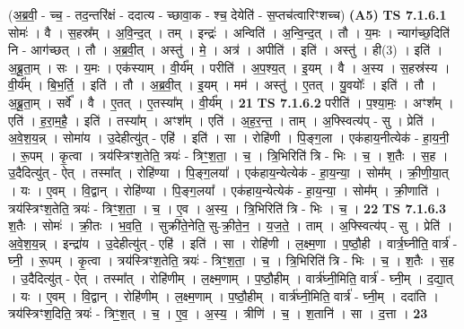 \documentclass[17pt]{extarticle}
\begin{document}
                  \newline
                      (अ॒ब्र॒वी॒ - च्च॒ - तद॒न्तरि॑क्षं - ददात्य - च्छावा॒क - श्च॒ देयेति॑ - स॒प्तच॑त्वारिꣳशच्च)  \textbf{(A5)} \newline \newline
                                \textbf{ TS 7.1.6.1} \newline
                  सोमः॑ । वै । स॒हस्र᳚म् । अ॒वि॒न्द॒त् । तम् । इन्द्रः॑ । अन्विति॑ । अ॒न्वि॒न्द॒त् । तौ । य॒मः । न्याग॑च्छ॒दिति॑ नि - आग॑च्छत् । तौ । अ॒ब्र॒वी॒त् । अस्तु॑ । मे॒ । अत्र॑ । अपीति॑ । इति॑ । अस्तु॑ । ही(3) । इति॑ । अ॒ब्रू॒ता॒म् । सः । य॒मः । एक॑स्याम् । वी॒र्य᳚म् । परीति॑ । अ॒प॒श्य॒त् । इ॒यम् । वै । अ॒स्य । स॒हस्र॑स्य । वी॒र्य᳚म् । बि॒भ॒र्ति॒ । इति॑ । तौ । अ॒ब्र॒वी॒त् । इ॒यम् । मम॑ । अस्तु॑ । ए॒तत् । यु॒वयोः᳚ । इति॑ । तौ । अ॒ब्रू॒ता॒म् । सर्वे᳚ । वै । ए॒तत् । ए॒तस्या᳚म् । वी॒र्य᳚म् । \textbf{  21} \newline
                  \newline
                                \textbf{ TS 7.1.6.2} \newline
                  परीति॑ । प॒श्या॒मः॒ । अꣳश᳚म् । एति॑ । ह॒रा॒म॒है॒ । इति॑ । तस्या᳚म् । अꣳश᳚म् ।  एति॑ । अ॒ह॒र॒न्त॒ । ताम् । अ॒फ्स्वित्य॑प् - सु । प्रेति॑ । अ॒वे॒श॒य॒न्न् । सोमा॑य । उ॒देहीत्यु॑त् - एहि॑ । इति॑ । सा । रोहि॑णी । पि॒ङ्ग॒ला । एक॑हाय॒नीत्येक॑ - हा॒य॒नी॒ । रू॒पम् । कृ॒त्वा । त्रय॑स्त्रिꣳश॒तेति॒ त्रयः॑ - त्रिꣳ॒॒श॒ता॒ । च॒ । त्रि॒भिरिति॑ त्रि - भिः । च॒ । श॒तैः । स॒ह । उ॒दैदित्यु॑त् - ऐत् । तस्मा᳚त् । रोहि॑ण्या । पि॒ङ्ग॒लया᳚ । एक॑हाय॒न्येत्येक॑ - हा॒य॒न्या॒ । सोम᳚म् । क्री॒णी॒या॒त् । यः । ए॒वम् । वि॒द्वान् । रोहि॑ण्या । पि॒ङ्ग॒लया᳚ । एक॑हाय॒न्येत्येक॑ - हा॒य॒न्या॒ । सोम᳚म् । क्री॒णाति॑ । त्रय॑स्त्रिꣳश॒तेति॒ त्रयः॑ - त्रिꣳ॒॒श॒ता॒ । च॒ । ए॒व । अ॒स्य॒ । त्रि॒भिरिति॑ त्रि - भिः । च॒ । \textbf{  22 } \newline
                  \newline
                                \textbf{ TS 7.1.6.3} \newline
                  श॒तैः । सोमः॑ । क्री॒तः । भ॒व॒ति॒ । सुक्री॑ते॒नेति॒ सु-क्री॒ते॒न॒ । य॒ज॒ते॒ । ताम् । अ॒फ्स्वित्य॑प् - सु । प्रेति॑ । अ॒वे॒श॒य॒न्न् । इन्द्रा॑य । उ॒देहीत्यु॑त् - एहि॑ । इति॑ । सा । रोहि॑णी । ल॒क्ष्म॒णा । प॒ष्ठौ॒ही । वार्त्र॒घ्नीति॒ वार्त्र॑ - घ्नी॒ । रू॒पम् । कृ॒त्वा । त्रय॑स्त्रिꣳश॒तेति॒ त्रयः॑ - त्रिꣳ॒॒श॒ता॒ । च॒ । त्रि॒भिरिति॑ त्रि - भिः । च॒ । श॒तैः । स॒ह । उ॒दैदित्यु॑त् - ऐत् । तस्मा᳚त् । रोहि॑णीम् । ल॒क्ष्म॒णाम् । प॒ष्ठौ॒हीम् । वार्त्र॑घ्नी॒मिति॒ वार्त्र॑ - घ्नी॒म् । द॒द्या॒त् । यः । ए॒वम् । वि॒द्वान् । रोहि॑णीम् । ल॒क्ष्म॒णाम् । प॒ष्ठौ॒हीम् । वार्त्र॑घ्नी॒मिति॒ वार्त्र॑ - घ्नी॒म् । ददा॑ति । त्रय॑स्त्रिꣳश॒दिति॒ त्रयः॑ - त्रिꣳ॒॒श॒त् । च॒ । ए॒व॒ । अ॒स्य॒ । त्रीणि॑ । च॒ । श॒तानि॑ । सा । द॒त्ता । \textbf{  23} \newline
\end{document}
